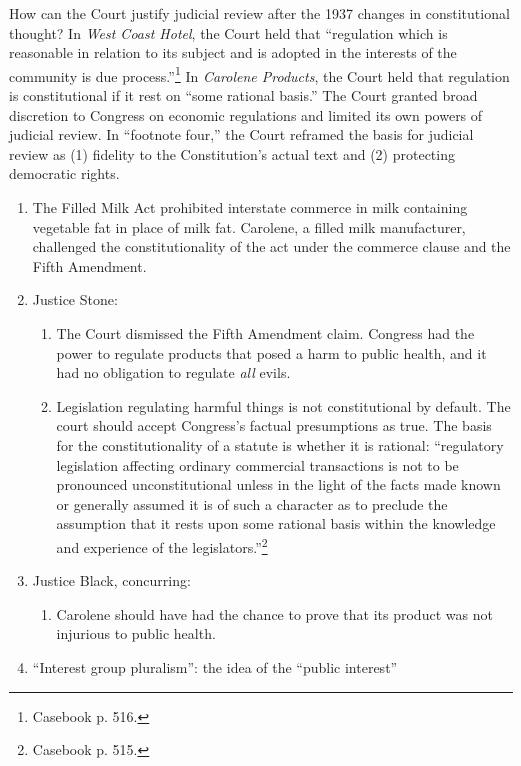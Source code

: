 How can the Court justify judicial review after the 1937 changes in 
constitutional thought? In \emph{West Coast Hotel}, the Court held that 
``regulation which is reasonable in relation to its subject and is adopted in 
the interests of the community is due process.''\footnote{Casebook p. 516.} In 
\emph{Carolene Products}, the Court held that regulation is constitutional if 
it rest on ``some rational basis.'' The Court granted broad discretion to 
Congress on economic regulations and limited its own powers of judicial 
review. In ``footnote four,'' the Court reframed the basis for judicial review 
as (1) fidelity to the Constitution's actual text and (2) protecting 
democratic rights.

\begin{enumerate}
    \item The Filled Milk Act prohibited interstate commerce in milk 
    containing vegetable fat in place of milk fat. Carolene, a filled milk 
    manufacturer, challenged the constitutionality of the act under the 
    commerce clause and the Fifth Amendment.
    \item Justice Stone:
    \begin{enumerate}
        \item The Court dismissed the Fifth Amendment claim. Congress had the 
        power to regulate products that posed a harm to public health, and it 
        had no obligation to regulate \emph{all} evils.
        \item Legislation regulating harmful things is not constitutional by 
        default. The court should accept Congress's factual presumptions 
        as true. The basis for the constitutionality of a statute is whether 
        it is rational: ``regulatory legislation affecting ordinary commercial 
        transactions is not to be pronounced unconstitutional unless in the 
        light of the facts made known or generally assumed it is of such a 
        character as to preclude the assumption that it rests upon some 
        rational basis within the knowledge and experience of the 
        legislators.''\footnote{Casebook p. 515.}
    \end{enumerate}
    \item Justice Black, concurring:
    \begin{enumerate}
        \item Carolene should have had the chance to prove that its product 
        was not injurious to public health. 
    \end{enumerate}
    \item ``Interest group pluralism'': the idea of the ``public interest'' 

\end{enumerate}

